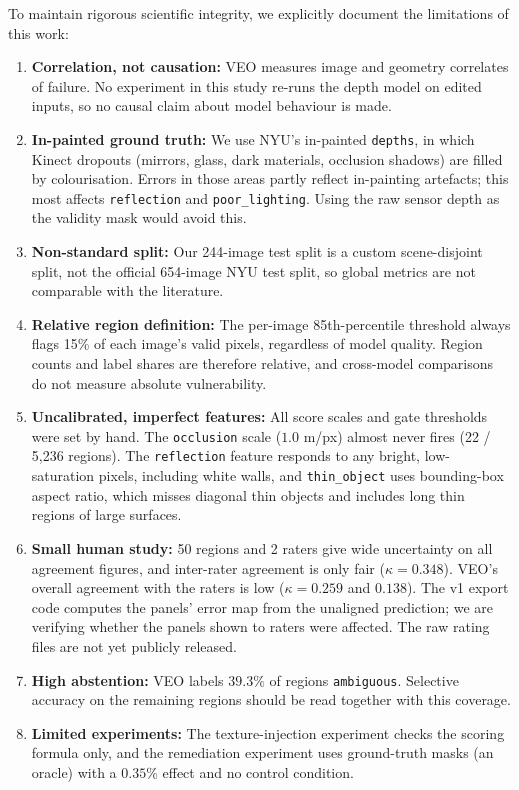\documentclass[11pt,a4paper]{article}
\begin{document}
To maintain rigorous scientific integrity, we explicitly document the limitations of this work:
\begin{enumerate}
    \item \textbf{Correlation, not causation:} VEO measures image and geometry correlates of failure. No experiment in this study re-runs the depth model on edited inputs, so no causal claim about model behaviour is made.
    \item \textbf{In-painted ground truth:} We use NYU's in-painted \texttt{depths}, in which Kinect dropouts (mirrors, glass, dark materials, occlusion shadows) are filled by colourisation. Errors in those areas partly reflect in-painting artefacts; this most affects \texttt{reflection} and \texttt{poor\_lighting}. Using the raw sensor depth as the validity mask would avoid this.
    \item \textbf{Non-standard split:} Our 244-image test split is a custom scene-disjoint split, not the official 654-image NYU test split, so global metrics are not comparable with the literature.
    \item \textbf{Relative region definition:} The per-image 85th-percentile threshold always flags 15\% of each image's valid pixels, regardless of model quality. Region counts and label shares are therefore relative, and cross-model comparisons do not measure absolute vulnerability.
    \item \textbf{Uncalibrated, imperfect features:} All score scales and gate thresholds were set by hand. The \texttt{occlusion} scale ($1.0$ m/px) almost never fires (22 / 5,236 regions). The \texttt{reflection} feature responds to any bright, low-saturation pixels, including white walls, and \texttt{thin\_object} uses bounding-box aspect ratio, which misses diagonal thin objects and includes long thin regions of large surfaces.
    \item \textbf{Small human study:} 50 regions and 2 raters give wide uncertainty on all agreement figures, and inter-rater agreement is only fair ($\kappa = 0.348$). VEO's overall agreement with the raters is low ($\kappa = 0.259$ and $0.138$). The v1 export code computes the panels' error map from the unaligned prediction; we are verifying whether the panels shown to raters were affected. The raw rating files are not yet publicly released.
    \item \textbf{High abstention:} VEO labels $39.3\%$ of regions \texttt{ambiguous}. Selective accuracy on the remaining regions should be read together with this coverage.
    \item \textbf{Limited experiments:} The texture-injection experiment checks the scoring formula only, and the remediation experiment uses ground-truth masks (an oracle) with a $0.35\%$ effect and no control condition.
\end{enumerate}
\end{document}
